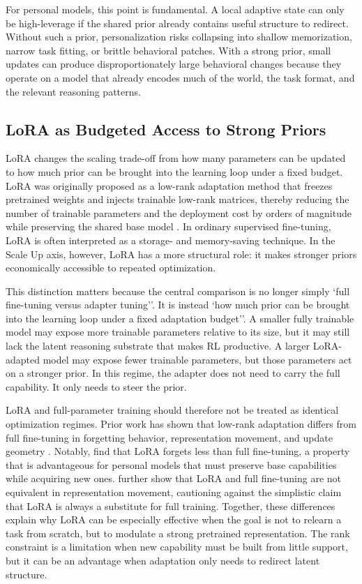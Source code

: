 For personal models, this point is fundamental. A local adaptive state can only be high-leverage if the shared prior already contains useful structure to redirect. Without such a prior, personalization risks collapsing into shallow memorization, narrow task fitting, or brittle behavioral patches. With a strong prior, small updates can produce disproportionately large behavioral changes because they operate on a model that already encodes much of the world, the task format, and the relevant reasoning patterns.

\subsection{LoRA as Budgeted Access to Strong Priors}\label{subsec:lora-budgeted-prior}

LoRA changes the scaling trade-off from how many parameters can be updated to how much prior can be brought into the learning loop under a fixed budget. LoRA was originally proposed as a low-rank adaptation method that freezes pretrained weights and injects trainable low-rank matrices, thereby reducing the number of trainable parameters and the deployment cost by orders of magnitude while preserving the shared base model \citep{hu2021lora}. In ordinary supervised fine-tuning, LoRA is often interpreted as a storage- and memory-saving technique. In the Scale Up axis, however, LoRA has a more structural role: it makes stronger priors economically accessible to repeated optimization.

This distinction matters because the central comparison is no longer simply `full fine-tuning versus adapter tuning''. It is instead `how much prior can be brought into the learning loop under a fixed adaptation budget''. A smaller fully trainable model may expose more trainable parameters relative to its size, but it may still lack the latent reasoning substrate that makes RL productive. A larger LoRA-adapted model may expose fewer trainable parameters, but those parameters act on a stronger prior. In this regime, the adapter does not need to carry the full capability. It only needs to steer the prior.

LoRA and full-parameter training should therefore not be treated as identical optimization regimes. Prior work has shown that low-rank adaptation differs from full fine-tuning in forgetting behavior, representation movement, and update geometry \citep{biderman2024loraforgets,shuttleworth2025loraillusion}. Notably, \citet{biderman2024loraforgets} find that LoRA forgets less than full fine-tuning, a property that is advantageous for personal models that must preserve base capabilities while acquiring new ones. \citet{shuttleworth2025loraillusion} further show that LoRA and full fine-tuning are not equivalent in representation movement, cautioning against the simplistic claim that LoRA is always a substitute for full training. Together, these differences explain why LoRA can be especially effective when the goal is not to relearn a task from scratch, but to modulate a strong pretrained representation. The rank constraint is a limitation when new capability must be built from little support, but it can be an advantage when adaptation only needs to redirect latent structure.

